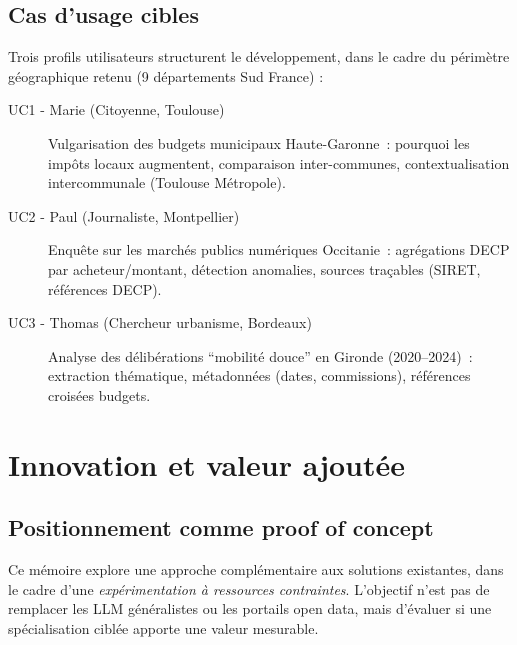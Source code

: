 \subsection{Cas d'usage cibles}

Trois profils utilisateurs structurent le développement, dans le cadre du périmètre géographique retenu (9 départements Sud France) :

\begin{description}
    \item[UC1 - Marie (Citoyenne, Toulouse)] Vulgarisation des budgets municipaux Haute-Garonne~:
          pourquoi les impôts locaux augmentent, comparaison inter-communes, contextualisation intercommunale (Toulouse Métropole).
    
    \item[UC2 - Paul (Journaliste, Montpellier)] Enquête sur les marchés publics numériques Occitanie~:
          agrégations DECP par acheteur/montant, détection anomalies, sources traçables (SIRET, références DECP).
    
    \item[UC3 - Thomas (Chercheur urbanisme, Bordeaux)] Analyse des délibérations ``mobilité douce'' en Gironde (2020--2024)~:
          extraction thématique, métadonnées (dates, commissions), références croisées budgets.
\end{description}

\section{Innovation et valeur ajoutée}

\subsection{Positionnement comme proof of concept}

Ce mémoire explore une approche complémentaire aux solutions existantes, dans le cadre d'une \textit{expérimentation à ressources contraintes}. L'objectif n'est pas de remplacer les LLM généralistes ou les portails open data, mais d'évaluer si une spécialisation ciblée apporte une valeur mesurable.

